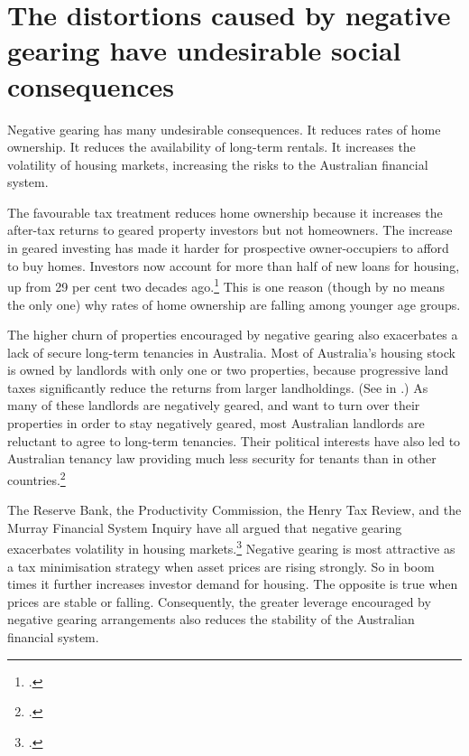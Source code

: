 \section{The distortions caused by negative gearing have undesirable social consequences}
Negative gearing has many undesirable consequences. It reduces rates of home ownership. 
It reduces the availability of long-term rentals. It increases the volatility of housing markets, increasing the risks to the Australian financial system. 

The favourable tax treatment reduces home ownership because it increases the after-tax returns to geared property investors but not homeowners. 
The increase in geared investing has made it harder for prospective owner-occupiers to afford to buy homes. 
Investors now account for more than half of new loans for housing, up from 29 per cent two decades ago.\footcite[][Table~8]{ABS2016a}  
This is one reason (though by no means the only one) why rates of home ownership are falling among younger age groups. 

The higher churn of properties encouraged by negative gearing also exacerbates a lack of secure long-term tenancies in Australia. 
Most of Australia’s housing stock is owned by landlords with only one or two properties, because progressive land taxes significantly reduce the returns from larger landholdings. (See  in \@.) 
As many of these landlords are negatively geared, and want to turn over their properties in order to stay negatively geared, most Australian landlords are reluctant to agree to long-term tenancies. 
Their political interests have also led to Australian tenancy law providing much less security for tenants than in other countries.\footcite[][19--21]{KellyMaresHarrisonEtAl2013} 

The Reserve Bank, the Productivity Commission, the Henry Tax Review, and the Murray Financial System Inquiry have all argued that negative gearing exacerbates volatility in housing markets.\footcites[][88]{RBA2014FinancialSystemInquirySubmission}[][45]{RBA2014SubmissionAffordableHousingInquiry}[][75 \& 131]{ProductivityCommission2004FirstHomeOwnership}[][70 \& 418]{HenryTaxReview2010}[][278]{FinancialSystemsInquiry2015}
Negative gearing is most attractive as a tax minimisation strategy when asset prices are rising strongly. 
So in boom times it further increases investor demand for housing. 
The opposite is true when prices are stable or falling. 
Consequently, the greater leverage encouraged by negative gearing arrangements also reduces the stability of the Australian financial system.

